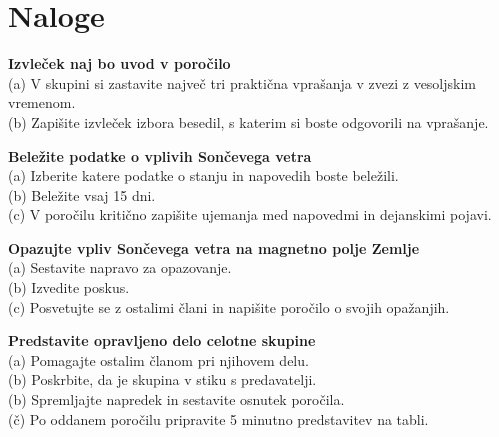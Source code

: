 \section*{Naloge}
%
\begin{prob}
\label{Nal:VesVrem_Izvl}
\textbf{Izvleček naj bo uvod v poročilo}\\
(a) V skupini si zastavite največ tri praktična vprašanja v zvezi z vesoljskim vremenom.\\
(b) Zapišite izvleček izbora besedil, s katerim si boste odgovorili na vprašanje.
\end{prob}

\begin{prob}
\label{Nal:VesVrem_Belez}
\textbf{Beležite podatke o vplivih Sončevega vetra}\\
(a) Izberite katere podatke o stanju in napovedih boste beležili.\\
(b) Beležite vsaj 15 dni. \\
(c) V poročilu kritično zapišite ujemanja med napovedmi in dejanskimi pojavi.
\end{prob}

\begin{prob}
	\label{Nal:VesVrem_Eksp}
	\textbf{Opazujte vpliv Sončevega vetra na magnetno polje Zemlje}\\
	(a) Sestavite napravo za opazovanje.\\
	(b) Izvedite poskus. \\
	(c) Posvetujte se z ostalimi člani in napišite poročilo o svojih opažanjih.
\end{prob}


\begin{prob}
\label{Nal:VesVrem_Predst}
\textbf{Predstavite opravljeno delo celotne skupine}\\
(a) Pomagajte ostalim članom pri njihovem delu. \\
(b) Poskrbite, da je skupina v stiku s predavatelji.\\
(b) Spremljajte napredek in sestavite osnutek poročila. \\
(č) Po oddanem poročilu pripravite 5 minutno predstavitev na tabli.
\end{prob}

%
